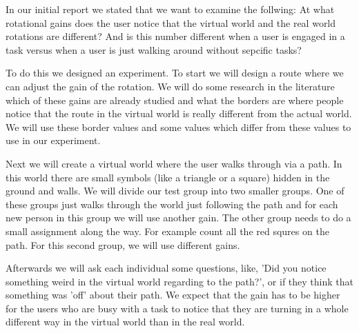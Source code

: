 In our initial report we stated that we want to examine the follwing:
At what rotational gains does the user notice that the virtual world and the real world rotations are different?
And is this number different when a user is engaged in a task versus when a user is just walking around without sepcific tasks?

To do this we designed an experiment.
To start we will design a route where we can adjust the gain of the rotation.
We will do some research in the literature which of these gains are already studied and what the borders are where people notice that the route in the virtual world is really different from the actual world.
We will use these border values and some values which differ from these values to use in our experiment.

Next we will create a virtual world where the user walks through via a path.
In this world there are small symbols (like a triangle or a square) hidden in the ground and walls.
We will divide our test group into two smaller groups.
One of these groups just walks through the world just following the path and for each new person in this group we will use another gain.
The other group needs to do a small assignment along the way.
For example count all the red squres on the path.
For this second group, we will use different gains.

Afterwards we will ask each individual some questions, like, 'Did you notice something weird in the virtual world regarding to the path?', or if they think that something was 'off' about their path.
We expect that the gain has to be higher for the users who are busy with a task to notice that they are turning in a whole different way in the virtual world than in the real world.
